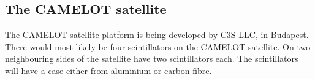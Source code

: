 \documentclass[12pt, a4paper,titlepage]{article}
\numberwithin{equation}{section}
\numberwithin{figure}{section}
\begin{document}

\subsection{The CAMELOT satellite}

The CAMELOT satellite platform is being developed by C3S LLC, in Budapest. There would most likely be four scintillators on the CAMELOT satellite. On two neighbouring sides of the satellite have two scintillators each. The scintillators will have a case either from aluminium or carbon fibre.
\end{document}
